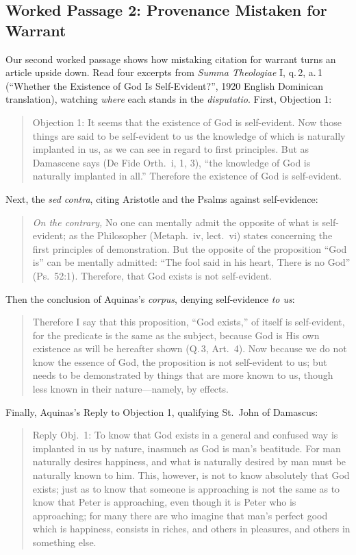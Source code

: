 \subsection{Worked Passage 2: Provenance Mistaken for Warrant}

Our second worked passage shows how mistaking citation for warrant turns an article upside down. Read four excerpts from \emph{Summa Theologiae} I, q.\,2, a.\,1 (``Whether the Existence of God Is Self-Evident?'', 1920 English Dominican translation), watching \emph{where} each stands in the \emph{disputatio}. First, Objection 1:

\begin{quote}
Objection 1: It seems that the existence of God is self-evident. Now those things are said to be self-evident to us the knowledge of which is naturally implanted in us, as we can see in regard to first principles. But as Damascene says (De Fide Orth.\ i, 1, 3), ``the knowledge of God is naturally implanted in all.'' Therefore the existence of God is self-evident.
\end{quote}

Next, the \emph{sed contra}, citing Aristotle and the Psalms against self-evidence:

\begin{quote}
\emph{On the contrary,} No one can mentally admit the opposite of what is self-evident; as the Philosopher (Metaph.\ iv, lect.\ vi) states concerning the first principles of demonstration. But the opposite of the proposition ``God is'' can be mentally admitted: ``The fool said in his heart, There is no God'' (Ps.\ 52:1). Therefore, that God exists is not self-evident.
\end{quote}

Then the conclusion of Aquinas's \emph{corpus}, denying self-evidence \emph{to us}:

\begin{quote}
Therefore I say that this proposition, ``God exists,'' of itself is self-evident, for the predicate is the same as the subject, because God is His own existence as will be hereafter shown (Q.\,3, Art.\ 4). Now because we do not know the essence of God, the proposition is not self-evident to us; but needs to be demonstrated by things that are more known to us, though less known in their nature---namely, by effects.
\end{quote}

Finally, Aquinas's Reply to Objection 1, qualifying St.\ John of Damascus:

\begin{quote}
Reply Obj.\ 1: To know that God exists in a general and confused way is implanted in us by nature, inasmuch as God is man's beatitude. For man naturally desires happiness, and what is naturally desired by man must be naturally known to him. This, however, is not to know absolutely that God exists; just as to know that someone is approaching is not the same as to know that Peter is approaching, even though it is Peter who is approaching; for many there are who imagine that man's perfect good which is happiness, consists in riches, and others in pleasures, and others in something else.
\end{quote}

